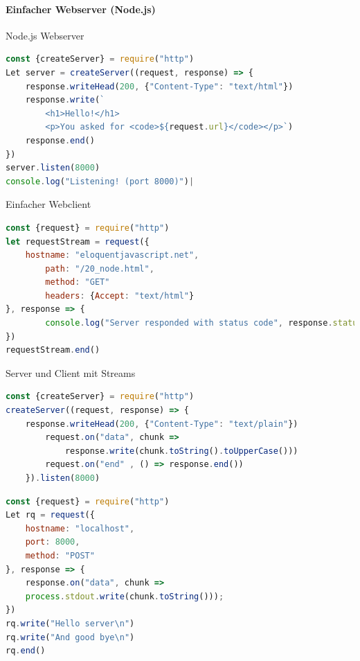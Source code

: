 \paragraph{Einfacher Webserver (Node.js)}

\begin{concept}{Node.js Webserver}
\begin{lstlisting}[language=JavaScript, style=basesmol]
const {createServer} = require("http")
Let server = createServer((request, response) => {
    response.writeHead(200, {"Content-Type": "text/html"})
    response.write(`
        <h1>Hello!</h1>
        <p>You asked for <code>${request.url}</code></p>`)
    response.end()
})
server.listen(8000)
console.log("Listening! (port 8000)")|
\end{lstlisting}
\end{concept}


\begin{code}{Einfacher Webclient}
\begin{lstlisting}[language=JavaScript, style=basesmol]
const {request} = require("http")
let requestStream = request({
    hostname: "eloquentjavascript.net",
        path: "/20_node.html",
        method: "GET"
        headers: {Accept: "text/html"}
}, response => {
        console.log("Server responded with status code", response.statusCode)
})
requestStream.end()
\end{lstlisting}
\end{code}

\begin{examplecode}{Server und Client mit Streams}
\begin{lstlisting}[language=JavaScript, style=basesmol]
const {createServer} = require("http")
createServer((request, response) => {
    response.writeHead(200, {"Content-Type": "text/plain"})
        request.on("data", chunk =>
            response.write(chunk.toString().toUpperCase()))
        request.on("end" , () => response.end())
    }).listen(8000)
\end{lstlisting}

\begin{lstlisting}[language=JavaScript, style=basesmol]
const {request} = require("http")
Let rq = request({
    hostname: "localhost",
    port: 8000,
    method: "POST"
}, response => {
    response.on("data", chunk =>
    process.stdout.write(chunk.toString()));
})
rq.write("Hello server\n")
rq.write("And good bye\n")
rq.end()
\end{lstlisting}
\end{examplecode}

